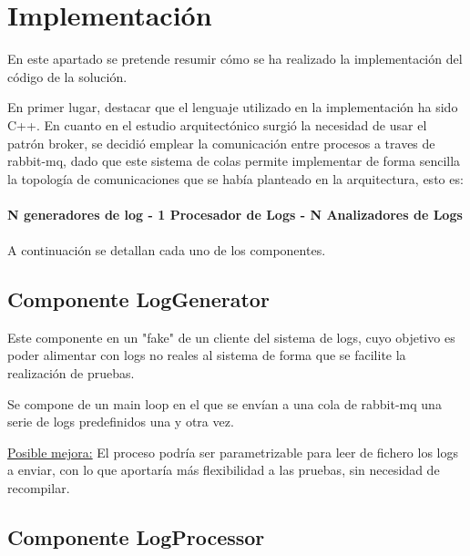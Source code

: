 \documentclass[11pt]{article}
\begin{document}
\pagebreak

\section{Implementación}

En este apartado se pretende resumir cómo se ha realizado la implementación del código de la solución.

En primer lugar, destacar que el lenguaje utilizado en la implementación ha sido C++. En cuanto en el estudio arquitectónico surgió la necesidad de usar el patrón broker, se decidió emplear la comunicación entre procesos a traves de rabbit-mq, dado que este sistema de colas permite implementar de forma sencilla la topología de comunicaciones que se había planteado en la arquitectura, esto es:
\\
\\
\textbf{N generadores de log - 1 Procesador de Logs - N Analizadores de Logs}
\\
\\
A continuación se detallan cada uno de los componentes.

\subsection{Componente LogGenerator}

Este componente en un "fake" de un cliente del sistema de logs, cuyo objetivo es poder alimentar con logs no reales al sistema de forma que se facilite la realización de pruebas.

Se compone de un main loop en el que se envían a una cola de rabbit-mq una serie de logs predefinidos una y otra vez.

\underline{Posible mejora:} El proceso podría ser parametrizable para leer de fichero los logs a enviar, con lo que aportaría más flexibilidad a las pruebas, sin necesidad de recompilar.

\subsection{Componente LogProcessor}
\end{document}
